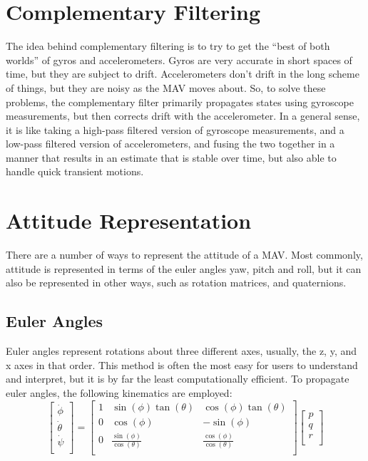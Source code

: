 \documentclass[paper=a4, fontsize=11pt]{scrartcl} %
\numberwithin{equation}{section} %
\numberwithin{figure}{section} %
\numberwithin{table}{section} %
\begin{document}
\section{Complementary Filtering}
The idea behind complementary filtering is to try to get the ``best of both worlds'' of gyros and accelerometers.  Gyros are very accurate in short spaces of time, but they are subject to drift.  Accelerometers don't drift in the long scheme of things, but they are noisy as the MAV moves about.  So, to solve these problems, the complementary filter primarily propagates states using gyroscope measurements, but then corrects drift with the accelerometer.  In a general sense, it is like taking a high-pass filtered version of gyroscope measurements, and a low-pass filtered version of accelerometers, and fusing the two together in a manner that results in an estimate that is stable over time, but also able to handle quick transient motions.

\section{Attitude Representation}
There are a number of ways to represent the attitude of a MAV.  Most commonly, attitude is represented in terms of the euler angles yaw, pitch and roll, but it can also be represented in other ways, such as rotation matrices, and quaternions.

\subsection{Euler Angles}
Euler angles represent rotations about three different axes, usually, the z, y, and x axes in that order.  This method is often the most easy for users to understand and interpret, but it is by far the least computationally efficient.  To propagate euler angles, the following kinematics are employed:
\begin{equation}
	\begin{bmatrix}
		\dot{\phi} \\
		\dot{\theta} \\
		\dot{\psi} \\
	\end{bmatrix}
	=
	\begin{bmatrix}
		1 & \sin(\phi) \tan(\theta) & \cos(\phi)\tan(\theta) \\
		0 & \cos(\phi)              & -\sin(\phi) \\
		0 & \frac{\sin(\phi)}{\cos(\theta)} & \frac{\cos(\phi)}{\cos(\theta)}  \\
	\end{bmatrix}
	\begin{bmatrix}
		p \\
		q \\
		r \\
	\end{bmatrix}
\end{equation}
\end{document}
